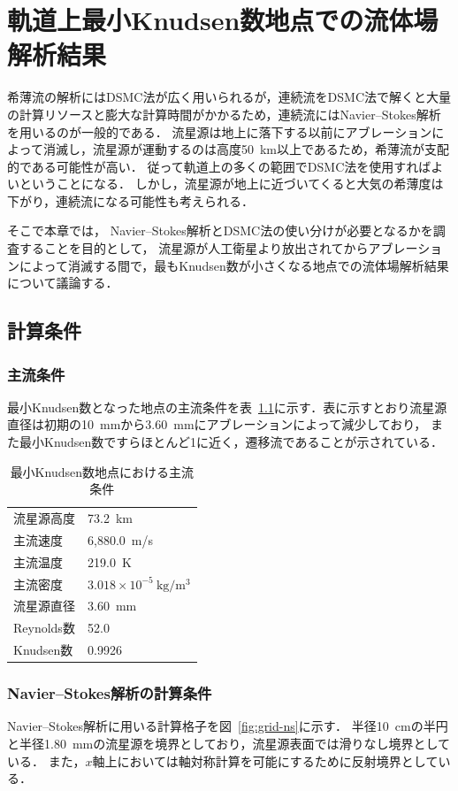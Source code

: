 \chapter{軌道上最小Knudsen数地点での流体場解析結果}
\label{chap:min-knud}

希薄流の解析にはDSMC法が広く用いられるが，連続流をDSMC法で解くと大量の計算リソースと膨大な計算時間がかかるため，連続流にはNavier–Stokes解析を用いるのが一般的である．
流星源は地上に落下する以前にアブレーションによって消滅し，流星源が運動するのは高度50~km以上であるため，希薄流が支配的である可能性が高い．
従って軌道上の多くの範囲でDSMC法を使用すればよいということになる．
しかし，流星源が地上に近づいてくると大気の希薄度は下がり，連続流になる可能性も考えられる．

そこで本章では，
Navier–Stokes解析とDSMC法の使い分けが必要となるかを調査することを目的として，
流星源が人工衛星より放出されてからアブレーションによって消滅する間で，最もKnudsen数が小さくなる地点での流体場解析結果について議論する．

\section{計算条件}
\subsection{主流条件}
最小Knudsen数となった地点の主流条件を表~\ref{tab:min-knud-condition}に示す．表に示すとおり流星源直径は初期の10~mmから3.60~mmにアブレーションによって減少しており，
また最小Knudsen数ですらほとんど1に近く，遷移流であることが示されている．
\begin{table}[H]
    \centering
    \caption{最小Knudsen数地点における主流条件}
    \begin{tabular}{ll}
    \hline\hline
        流星源高度 & 73.2~km \\
        主流速度 & 6,880.0~m/s \\
        主流温度 & 219.0~K \\
        主流密度 & $3.018\times10^{-5}\ \mathrm{kg/m^3}$ \\
        流星源直径 & 3.60~mm \\
        Reynolds数 & 52.0 \\
        Knudsen数 & 0.9926 \\
    \hline\hline
    \end{tabular}
    \label{tab:min-knud-condition}
\end{table}

\subsection{Navier–Stokes解析の計算条件}
Navier–Stokes解析に用いる計算格子を図~\ref{fig:grid-ns}に示す．
半径10~cmの半円と半径1.80~mmの流星源を境界としており，流星源表面では滑りなし境界としている．
また，$x$軸上においては軸対称計算を可能にするために反射境界としている．

